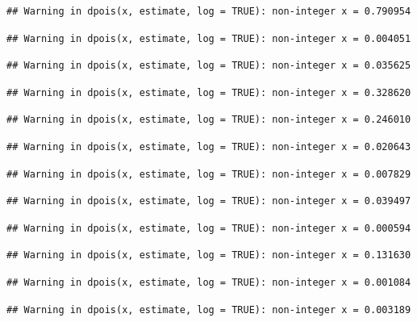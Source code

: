\documentclass[]{article}
\begin{document}
\begin{verbatim}
## Warning in dpois(x, estimate, log = TRUE): non-integer x = 0.790954
\end{verbatim}

\begin{verbatim}
## Warning in dpois(x, estimate, log = TRUE): non-integer x = 0.004051
\end{verbatim}

\begin{verbatim}
## Warning in dpois(x, estimate, log = TRUE): non-integer x = 0.035625
\end{verbatim}

\begin{verbatim}
## Warning in dpois(x, estimate, log = TRUE): non-integer x = 0.328620
\end{verbatim}

\begin{verbatim}
## Warning in dpois(x, estimate, log = TRUE): non-integer x = 0.246010
\end{verbatim}

\begin{verbatim}
## Warning in dpois(x, estimate, log = TRUE): non-integer x = 0.020643
\end{verbatim}

\begin{verbatim}
## Warning in dpois(x, estimate, log = TRUE): non-integer x = 0.007829
\end{verbatim}

\begin{verbatim}
## Warning in dpois(x, estimate, log = TRUE): non-integer x = 0.039497
\end{verbatim}

\begin{verbatim}
## Warning in dpois(x, estimate, log = TRUE): non-integer x = 0.000594
\end{verbatim}

\begin{verbatim}
## Warning in dpois(x, estimate, log = TRUE): non-integer x = 0.131630
\end{verbatim}

\begin{verbatim}
## Warning in dpois(x, estimate, log = TRUE): non-integer x = 0.001084
\end{verbatim}

\begin{verbatim}
## Warning in dpois(x, estimate, log = TRUE): non-integer x = 0.003189
\end{verbatim}
\end{document}
